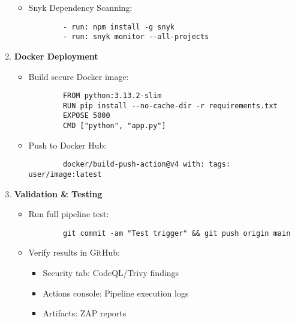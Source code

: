 \documentclass[conference]{IEEEtran}
\begin{document}
\begin{enumerate}
\begin{itemize}
        \item Snyk Dependency Scanning:
        \begin{verbatim}
        - run: npm install -g snyk
        - run: snyk monitor --all-projects
        \end{verbatim}
    \end{itemize}

    \item \textbf{Docker Deployment}
    \begin{itemize}
        \item Build secure Docker image:
        \begin{verbatim}
        FROM python:3.13.2-slim
        RUN pip install --no-cache-dir -r requirements.txt
        EXPOSE 5000
        CMD ["python", "app.py"]
        \end{verbatim}
        \item Push to Docker Hub:
        \begin{verbatim}
        docker/build-push-action@v4 with: tags: user/image:latest
        \end{verbatim}
    \end{itemize}

    \item \textbf{Validation \& Testing}
    \begin{itemize}
        \item Run full pipeline test:
        \begin{verbatim}
        git commit -am "Test trigger" && git push origin main
        \end{verbatim}
        \item Verify results in GitHub:
        \begin{itemize}
            \item Security tab: CodeQL/Trivy findings
            \item Actions console: Pipeline execution logs
            \item Artifacts: ZAP reports
        \end{itemize}
    \end{itemize}
\end{enumerate}
\end{document}

